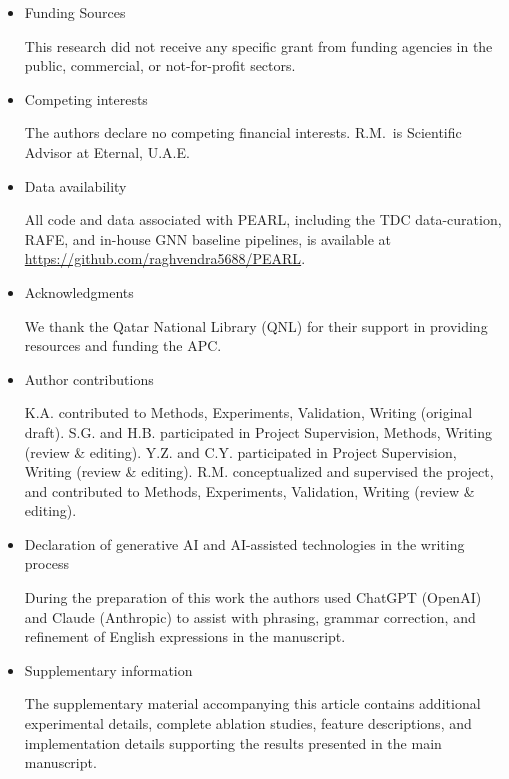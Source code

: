 \documentclass[pdflatex,sn-mathphys-num,Numbered]{sn-jnl}%
\newcommand{\pending}[1]{{\color{red}\textbf{[PENDING: #1]}}}%
\begin{document}
\begin{itemize}
\item Funding Sources

This research did not receive any specific grant from funding agencies in the public, commercial, or not-for-profit sectors.

\item Competing interests

The authors declare no competing financial interests. R.M.\ is Scientific Advisor at Eternal, U.A.E.

\item Data availability

All code and data associated with PEARL, including the TDC data-curation, RAFE, and in-house GNN baseline pipelines, is available at \url{https://github.com/raghvendra5688/PEARL}.

\item Acknowledgments

We thank the Qatar National Library (QNL) for their support in providing resources and funding the APC.

\item Author contributions

K.A. contributed to Methods, Experiments, Validation, Writing (original draft). S.G. and H.B. participated in Project Supervision, Methods, Writing (review \& editing). Y.Z. and C.Y. participated in Project Supervision, Writing (review \& editing). R.M. conceptualized and supervised the project, and contributed to Methods, Experiments, Validation, Writing (review \& editing).

\item{Declaration of generative AI and AI-assisted technologies in the writing process}

During the preparation of this work the authors used ChatGPT (OpenAI) and Claude (Anthropic) to assist with phrasing, grammar correction, and refinement of English expressions in the manuscript. %

\item{Supplementary information}

The supplementary material accompanying this article contains additional experimental details, complete ablation studies, feature descriptions, and implementation details supporting the results presented in the main manuscript.

\end{itemize}
\end{document}

